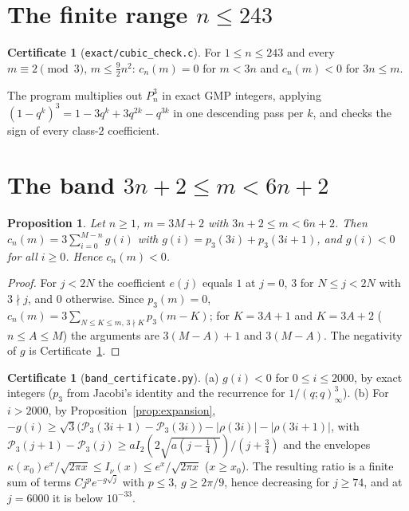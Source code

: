 \documentclass[11pt,reqno]{amsart}
\theoremstyle{plain}
\newtheorem{proposition}[theorem]{Proposition}
\theoremstyle{definition}
\newtheorem{certificate}[theorem]{Certificate}
\newcommand{\cP}{\mathcal{P}}
\begin{document}
\section{The finite range $n\le243$}\label{sec:finite}
\begin{certificate}[\texttt{exact/cubic\_check.c}]\label{cert:finite}
For $1\le n\le243$ and every $m\equiv2\pmod3$, $m\le\frac92n^2$: $c_n(m)=0$ for $m<3n$ and $c_n(m)<0$ for $3n\le m$.
\end{certificate}
The program multiplies out $P_n^3$ in exact GMP integers, applying $(1-q^k)^3=1-3q^k+3q^{2k}-q^{3k}$ in one descending pass per $k$,
and checks the sign of every class-$2$ coefficient.

\section{The band $3n+2\le m<6n+2$}\label{sec:band}
\begin{proposition}\label{prop:band}
Let $n\ge1$, $m=3M+2$ with $3n+2\le m<6n+2$. Then $c_n(m)=3\sum_{i=0}^{M-n}g(i)$ with $g(i)=p_3(3i)+p_3(3i+1)$, and $g(i)<0$ for all
$i\ge0$. Hence $c_n(m)<0$.
\end{proposition}
\begin{proof}
For $j<2N$ the coefficient $e(j)$ equals $1$ at $j=0$, $3$ for $N\le j<2N$ with $3\nmid j$, and $0$ otherwise. Since $p_3(m)=0$,
$c_n(m)=3\sum_{N\le K\le m,\,3\nmid K}p_3(m-K)$; for $K=3A+1$ and $K=3A+2$ ($n\le A\le M$) the arguments are $3(M-A)+1$ and $3(M-A)$.
The negativity of $g$ is Certificate~\ref{cert:band}.
\end{proof}

\begin{certificate}[\texttt{band\_certificate.py}]\label{cert:band}
(a) $g(i)<0$ for $0\le i\le2000$, by exact integers ($p_3$ from Jacobi's identity and the recurrence for $1/(q;q)_\infty^3$).
(b) For $i>2000$, by Proposition~\ref{prop:expansion},
$-g(i)\ge\sqrt3\bigl(\cP_3(3i+1)-\cP_3(3i)\bigr)-|\rho(3i)|-|\rho(3i+1)|$, with
$\cP_3(j+1)-\cP_3(j)\ge aI_2(2\sqrt{a(j-\frac14)})/(j+\frac34)$ and the envelopes $\kappa(x_0)e^x/\sqrt{2\pi x}\le I_\nu(x)\le
e^x/\sqrt{2\pi x}$ ($x\ge x_0$). The resulting ratio is a finite sum of terms $Cj^pe^{-g\sqrt{j}}$ with $p\le3$, $g\ge2\pi/9$, hence
decreasing for $j\ge74$, and at $j=6000$ it is below $10^{-33}$.
\end{certificate}
\end{document}
